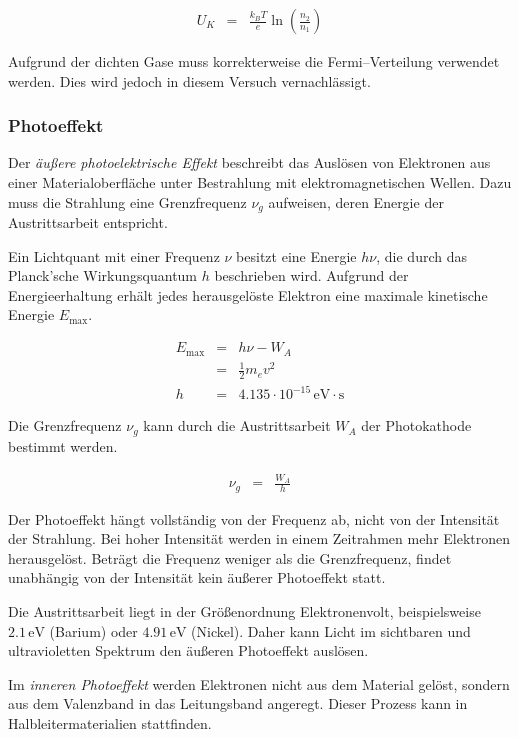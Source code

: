 \documentclass[12pt,a4paper]{scrartcl}
\numberwithin{equation}{section} %
\begin{document}
\begin{eqnarray}
	U_K &=& \frac{k_B T}{e} \ln \left( \frac{n_2}{n_1} \right) \label{eq:Kontaktspannung}
\end{eqnarray}

\noindent
Aufgrund der dichten Gase muss korrekterweise die Fermi--Verteilung verwendet werden. \cite{Gerthsen} Dies wird jedoch in diesem Versuch vernachlässigt.

\subsubsection{Photoeffekt}
Der \emph{äußere photoelektrische Effekt} beschreibt das Auslösen von Elektronen aus einer Materialoberfläche unter Bestrahlung mit elektromagnetischen Wellen. Dazu muss die Strahlung eine Grenzfrequenz $\nu_g$ aufweisen, deren Energie der Austrittsarbeit entspricht.

Ein Lichtquant mit einer Frequenz $\nu$ besitzt eine Energie $h\nu$, die durch das Planck'sche Wirkungsquantum $h$ beschrieben wird. Aufgrund der Energieerhaltung erhält jedes herausgelöste Elektron eine maximale kinetische Energie $E_\mathrm{max}$.

\begin{eqnarray}
	E_\mathrm{max} &=& h\nu - W_A \\
		&=& \frac{1}{2} m_e v^2 \\
	h &=& 4.135 \cdot 10^{-15} \mathrm{\,eV \cdot s}
\end{eqnarray}

\noindent
Die Grenzfrequenz $\nu_g$ kann durch die Austrittsarbeit $W_A$ der Photokathode bestimmt werden.

\begin{eqnarray}
	\nu_g &=& \frac{W_A}{h}
\end{eqnarray}

\noindent
Der Photoeffekt hängt vollständig von der Frequenz ab, nicht von der Intensität der Strahlung. Bei hoher Intensität werden in einem Zeitrahmen mehr Elektronen herausgelöst. Beträgt die Frequenz weniger als die Grenzfrequenz, findet unabhängig von der Intensität kein äußerer Photoeffekt statt.

Die Austrittsarbeit liegt in der Größenordnung Elektronenvolt, beispielsweise $2.1\mathrm{\,eV}$ (Barium) oder $4.91\mathrm{\,eV}$ (Nickel). \cite{Demtröder} Daher kann Licht im sichtbaren und ultravioletten Spektrum den äußeren Photoeffekt auslösen.

Im \emph{inneren Photoeffekt} werden Elektronen nicht aus dem Material gelöst, sondern aus dem Valenzband in das Leitungsband angeregt. Dieser Prozess kann in Halbleitermaterialien stattfinden.
\end{document}
